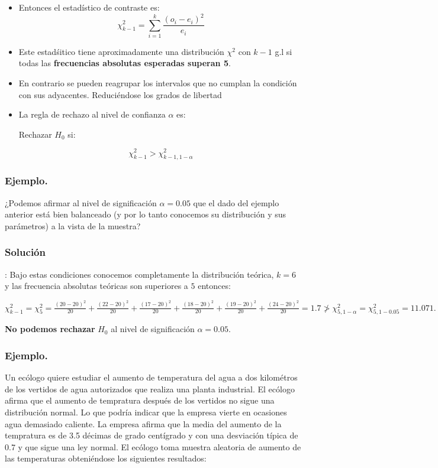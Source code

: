 \begin{frame}
\begin{itemize}
\item Entonces el estadístico de contraste es:
 $$\chi_{k-1}^2=\sum_{i=1}^k \frac{\left(o_{i}-e_{i}\right)^2}{e_{i}}$$

\item Este estadśitico tiene aproximadamente una distribución $\chi^2$ con $k-1$ g.l si todas las \textbf{frecuencias  absolutas esperadas superan  5}.

\item En  contrario se pueden reagrupar los  intervalos que no cumplan la condición con sus adyacentes. 
Reduciéndose los grados de libertad
\item   La regla de rechazo al nivel de confianza $\alpha$ es:

           Rechazar $H_{0}$ si:

          $$\chi^2_{k-1}>\chi_{k-1,1-\alpha}^2$$
\end{itemize}
\end{frame}

\begin{frame}
\frametitle{Ejemplo.} 
¿Podemos afirmar al nivel de significación
   $\alpha=0.05$ que el dado del ejemplo anterior está bien balanceado (y por lo tanto
   conocemos su distribución y sus parámetros)
   a la vista de la muestra?
\end{frame}

\begin{frame}
\frametitle{Solución}:
Bajo estas condiciones conocemos completamente la distribución teórica, $k=6$ y las frecuencia absolutas teóricas son superiores a $5$ entonces:

       $\chi^2_{k-1}=\chi^2_{5}=\frac{(20-20)^2}{20}+\frac{(22-20)^2}{20}+
       \frac{(17-20)^2}{20}+
  \frac{(18-20)^2}{20}+\frac{(19-20)^2}{20}+\frac{(24-20)^2}{20}=1.7\not>
       \chi_{5,1-\alpha}^2=\chi_{5,1-0.05}^2=11.071 .$

       \textbf{No podemos rechazar} $H_{0}$ al nivel de significación
       $\alpha=0.05$.
\end{frame}

\begin{frame}
\frametitle{Ejemplo.}
Un ecólogo quiere estudiar el aumento de temperatura del agua  a dos kilométros  de los vertidos de agua  autorizados que realiza una planta industrial. El ecólogo afirma que el aumento de tempratura después de los vertidos no sigue una distribución normal. Lo que podría indicar que la empresa vierte en ocasiones agua  demasiado caliente. La empresa afirma que la media del aumento de la tempratura es de 3.5 décimas de grado centígrado y  con una desviación típica  de 0.7 y que sigue una ley normal. El ecólogo toma muestra aleatoria de aumento de las temperaturas obteniéndose los siguientes resultados:
\end{frame}

